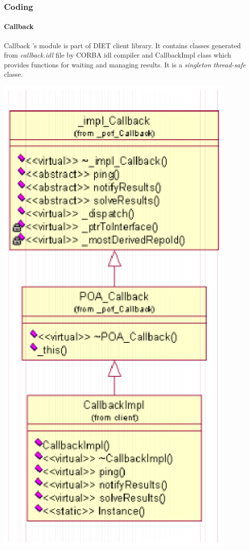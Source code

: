   \subsubsection{Coding}
  \paragraph{Callback}
  Callback 's module is part of DIET client library. It contains classes generated
  from \emph{callback.idl} file by CORBA idl compiler and CallbackImpl class
  which provides functions for waiting and managing results. It is a \emph{singleton}
  \emph{thread-safe} classe.

  \includegraphics{./fig/CorbaClientClassDIagram.ps}

